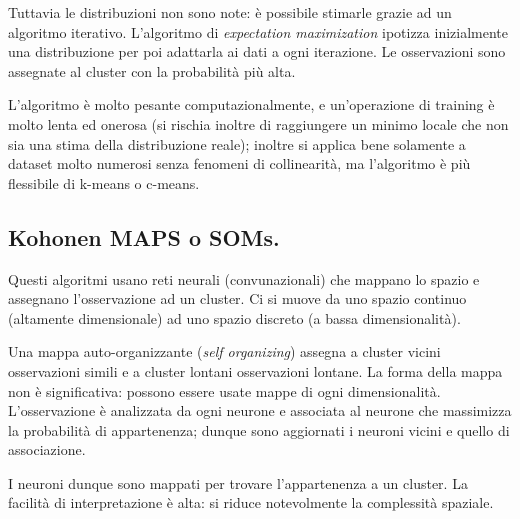 \documentclass[11pt, a4page, twocolumn]{article}
\begin{document}
Tuttavia le distribuzioni non sono note: è possibile stimarle grazie ad un algoritmo iterativo.
L'algoritmo di \textit{expectation maximization} ipotizza inizialmente una distribuzione per poi adattarla ai dati a ogni iterazione.
Le osservazioni sono assegnate al cluster con la probabilità più alta.

L'algoritmo è molto pesante computazionalmente, e un'operazione di training è molto lenta ed onerosa (si rischia inoltre di raggiungere un minimo locale che non sia una stima della distribuzione reale); inoltre si applica bene solamente a dataset molto numerosi senza fenomeni di collinearità, ma l'algoritmo è più flessibile di k-means o c-means.

\subsection{Kohonen MAPS o SOMs.}
Questi algoritmi usano reti neurali (convunazionali) che mappano lo spazio e assegnano l'osservazione ad un cluster.
Ci si muove da uno spazio continuo (altamente dimensionale) ad uno spazio discreto (a bassa dimensionalità).

Una mappa auto-organizzante (\textit{self organizing}) assegna a cluster vicini osservazioni simili e a cluster lontani osservazioni lontane.
La forma della mappa non è significativa: possono essere usate mappe di ogni dimensionalità.
L'osservazione è analizzata da ogni neurone e associata al neurone che massimizza la probabilità di appartenenza; dunque sono aggiornati i neuroni vicini e quello di associazione.

I neuroni dunque sono mappati per trovare l'appartenenza a un cluster.
La facilità di interpretazione è alta: si riduce notevolmente la complessità spaziale.
\end{document}
